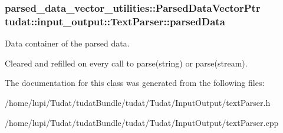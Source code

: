 \subsubsection[{\texorpdfstring{parsed\+Data}{parsedData}}]{\setlength{\rightskip}{0pt plus 5cm}parsed\+\_\+data\+\_\+vector\+\_\+utilities\+::\+Parsed\+Data\+Vector\+Ptr tudat\+::input\+\_\+output\+::\+Text\+Parser\+::parsed\+Data\hspace{0.3cm}{\ttfamily [protected]}}\hypertarget{classtudat_1_1input__output_1_1TextParser_aaae584bf29ac4466230bf18c976a28d7}{}\label{classtudat_1_1input__output_1_1TextParser_aaae584bf29ac4466230bf18c976a28d7}


Data container of the parsed data. 

Cleared and refilled on every call to parse(string) or parse(stream). 

The documentation for this class was generated from the following files\+:\begin{DoxyCompactItemize}
\item 
/home/lupi/\+Tudat/tudat\+Bundle/tudat/\+Tudat/\+Input\+Output/text\+Parser.\+h\item 
/home/lupi/\+Tudat/tudat\+Bundle/tudat/\+Tudat/\+Input\+Output/text\+Parser.\+cpp\end{DoxyCompactItemize}
